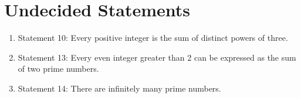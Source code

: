 \documentclass{article}
\begin{document}
\section{Undecided Statements}
\begin{enumerate}
    \item Statement 10: Every positive integer is the sum of distinct powers of three.\newline
    \item Statement 13: Every even integer greater than 2 can be expressed as the sum of two prime numbers.
    \item Statement 14: There are infinitely many prime numbers.\newline
\end{enumerate}
\end{document}
